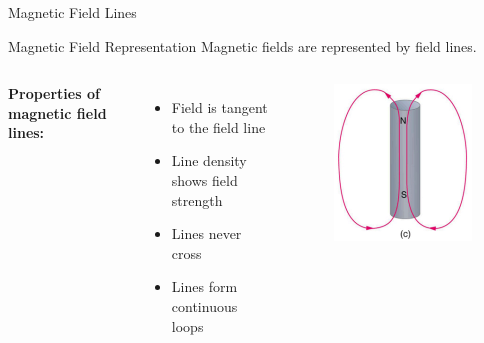\documentclass{beamer}
\begin{document}
\begin{frame}{Magnetic Field Lines}
\begin{block}{Magnetic Field Representation}
Magnetic fields are represented by field lines.
\end{block}

\begin{columns}
\textbf{Properties of magnetic field lines:}
\begin{itemize}
\item Field is tangent to the field line
\item Line density shows field strength
\item Lines never cross
\item Lines form continuous loops
\end{itemize}

\begin{figure}
\centering
\includegraphics[width=1\linewidth]{mmgmg.png}
\end{figure}
\end{columns}
\end{frame}
\end{document}
